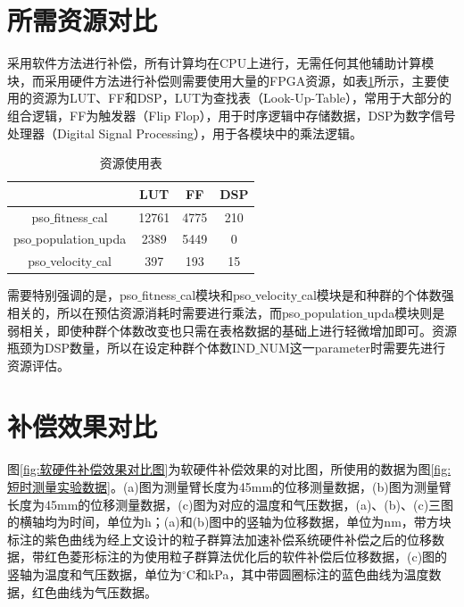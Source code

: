 \section{所需资源对比}
采用软件方法进行补偿，所有计算均在CPU上进行，无需任何其他辅助计算模块，而采用硬件方法进行补偿则需要使用大量的FPGA资源，如表\ref{tab:资源使用表}所示，主要使用的资源为LUT、FF和DSP，LUT为查找表（Look-Up-Table），常用于大部分的组合逻辑，FF为触发器（Flip Flop），用于时序逻辑中存储数据，DSP为数字信号处理器（Digital Signal Processing），用于各模块中的乘法逻辑。
\begin{table}[H]
  \centering
  \caption{资源使用表}
  \label{tab:资源使用表}
  \begin{tabular}{c|c|c|c}
      \hline
                                    & LUT        & FF        &DSP            \\ \hline
      pso$\_$fitness$\_$cal         & 12761      & 4775      & 210           \\ \hline
      pso$\_$population$\_$upda     & 2389       & 5449      & 0              \\ \hline
      pso$\_$velocity$\_$cal        & 397        & 193       & 15             \\ \hline
  \end{tabular}
\end{table}

需要特别强调的是，pso$\_$fitness$\_$cal模块和pso$\_$velocity$\_$cal模块是和种群的个体数强相关的，所以在预估资源消耗时需要进行乘法，而pso$\_$population$\_$upda模块则是弱相关，即使种群个体数改变也只需在表格数据的基础上进行轻微增加即可。资源瓶颈为DSP数量，所以在设定种群个体数IND$\_$NUM这一parameter时需要先进行资源评估。

\section{补偿效果对比}
图\ref{fig:软硬件补偿效果对比图}为软硬件补偿效果的对比图，所使用的数据为图\ref{fig:短时测量实验数据}。(a)图为测量臂长度为45mm的位移测量数据，(b)图为测量臂长度为45mm的位移测量数据，(c)图为对应的温度和气压数据，(a)、(b)、(c)三图的横轴均为时间，单位为h；(a)和(b)图中的竖轴为位移数据，单位为nm，带方块标注的紫色曲线为经上文设计的粒子群算法加速补偿系统硬件补偿之后的位移数据，带红色菱形标注的为使用粒子群算法优化后的软件补偿后位移数据，(c)图的竖轴为温度和气压数据，单位为$^{\circ} \mathrm{C}$和kPa，其中带圆圈标注的蓝色曲线为温度数据，红色曲线为气压数据。

